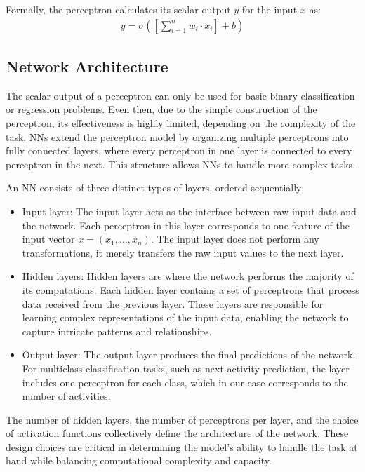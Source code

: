 Formally, the perceptron calculates its scalar output $y$ for the input $x$ as:
\begin{align}
  \label{math:perceptron}
	y = \sigma\left(\left[\sum_{i = 1}^n w_i \cdot x_i \right] + b\right)
\end{align}


\subsection{Network Architecture}
The scalar output of a perceptron can only be used for basic binary classification or regression problems.
Even then, due to the simple construction of the perceptron,
its effectiveness is highly limited, depending on the complexity of the task. \cite{perceptron_limited}
NNs extend the perceptron model by organizing multiple perceptrons into fully connected layers,
where every perceptron in one layer is connected to every perceptron in the next.
This structure allows NNs to handle more complex tasks.

An NN consists of three distinct types of layers, ordered sequentially:
\begin{itemize}
\item Input layer:
The input layer acts as the interface between raw input data and the network.
Each perceptron in this layer corresponds to one feature of the input vector $x = (x_1, ..., x_n)$.
The input layer does not perform any transformations, it merely transfers the raw input values to the next layer.
\item Hidden layers:
Hidden layers are where the network performs the majority of its computations.
Each hidden layer contains a set of perceptrons that process data received from the previous layer.
These layers are responsible for learning complex representations of the input data,
enabling the network to capture intricate patterns and relationships.
\item Output layer:
The output layer produces the final predictions of the network.
For multiclass classification tasks, such as next activity prediction,
the layer includes one perceptron for each class,
which in our case corresponds to the number of activities.
\end{itemize}

The number of hidden layers, the number of perceptrons per layer,
and the choice of activation functions collectively define the architecture of the network.
These design choices are critical in determining the model's ability to handle the task at hand
while balancing computational complexity and capacity.

